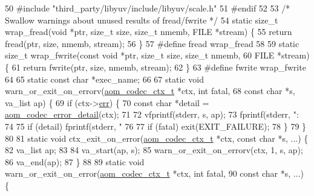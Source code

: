 \begin{DoxyCodeInclude}
50 \textcolor{preprocessor}{#include "third\_party/libyuv/include/libyuv/scale.h"}
51 \textcolor{preprocessor}{#endif}
52 
53 \textcolor{comment}{/* Swallow warnings about unused results of fread/fwrite */}
54 \textcolor{keyword}{static} \textcolor{keywordtype}{size\_t} wrap\_fread(\textcolor{keywordtype}{void} *ptr, \textcolor{keywordtype}{size\_t} size, \textcolor{keywordtype}{size\_t} nmemb, FILE *stream) \{
55   \textcolor{keywordflow}{return} fread(ptr, size, nmemb, stream);
56 \}
57 \textcolor{preprocessor}{#define fread wrap\_fread}
58 
59 \textcolor{keyword}{static} \textcolor{keywordtype}{size\_t} wrap\_fwrite(\textcolor{keyword}{const} \textcolor{keywordtype}{void} *ptr, \textcolor{keywordtype}{size\_t} size, \textcolor{keywordtype}{size\_t} nmemb,
60                           FILE *stream) \{
61   \textcolor{keywordflow}{return} fwrite(ptr, size, nmemb, stream);
62 \}
63 \textcolor{preprocessor}{#define fwrite wrap\_fwrite}
64 
65 \textcolor{keyword}{static} \textcolor{keyword}{const} \textcolor{keywordtype}{char} *exec\_name;
66 
67 \textcolor{keyword}{static} \textcolor{keywordtype}{void} warn\_or\_exit\_on\_errorv(\hyperlink{structaom__codec__ctx}{aom\_codec\_ctx\_t} *ctx, \textcolor{keywordtype}{int} fatal,
68                                    \textcolor{keyword}{const} \textcolor{keywordtype}{char} *s, va\_list ap) \{
69   \textcolor{keywordflow}{if} (ctx->\hyperlink{structaom__codec__ctx_a4cf9c265a7c34e92bb02d04aa3cab718}{err}) \{
70     \textcolor{keyword}{const} \textcolor{keywordtype}{char} *detail = \hyperlink{group__codec_ga43a70562598b485685794a4e9d9d53f7}{aom\_codec\_error\_detail}(ctx);
71 
72     vfprintf(stderr, s, ap);
73     fprintf(stderr, \textcolor{stringliteral}{": %
74 
75     \textcolor{keywordflow}{if} (detail) fprintf(stderr, \textcolor{stringliteral}{"    %
76 
77     \textcolor{keywordflow}{if} (fatal) exit(EXIT\_FAILURE);
78   \}
79 \}
80 
81 \textcolor{keyword}{static} \textcolor{keywordtype}{void} ctx\_exit\_on\_error(\hyperlink{structaom__codec__ctx}{aom\_codec\_ctx\_t} *ctx, \textcolor{keyword}{const} \textcolor{keywordtype}{char} *s, ...) \{
82   va\_list ap;
83 
84   va\_start(ap, s);
85   warn\_or\_exit\_on\_errorv(ctx, 1, s, ap);
86   va\_end(ap);
87 \}
88 
89 \textcolor{keyword}{static} \textcolor{keywordtype}{void} warn\_or\_exit\_on\_error(\hyperlink{structaom__codec__ctx}{aom\_codec\_ctx\_t} *ctx, \textcolor{keywordtype}{int} fatal,
90                                   \textcolor{keyword}{const} \textcolor{keywordtype}{char} *s, ...) \{
}}
\end{DoxyCodeInclude}
